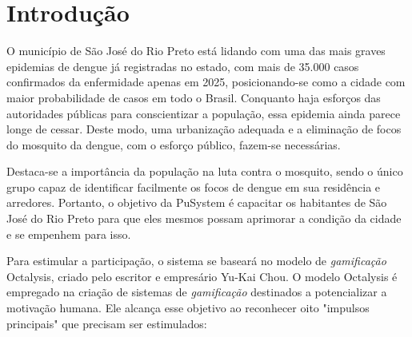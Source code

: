 \documentclass[a5paper, 12pt]{article}
\begin{document}
\section{Introdução}
O município de São José do Rio Preto está lidando com uma das mais graves epidemias de dengue já registradas no estado, com mais de 35.000 casos confirmados da enfermidade apenas em 2025, posicionando-se como a cidade com maior probabilidade de casos em todo o Brasil. Conquanto haja esforços das autoridades públicas para conscientizar a população, essa epidemia ainda parece longe de cessar. Deste modo, uma urbanização adequada e a eliminação de focos do mosquito da dengue, com o esforço público, fazem-se necessárias.

Destaca-se a importância da população na luta contra o mosquito, sendo o único grupo capaz de identificar facilmente os focos de dengue em sua residência e arredores. Portanto, o objetivo da PuSystem é capacitar os habitantes de São José do Rio Preto para que eles mesmos possam aprimorar a condição da cidade e se empenhem para isso.

Para estimular a participação, o sistema se baseará no modelo de \textit{gamificação} Octalysis, criado pelo escritor e empresário Yu-Kai Chou.  O modelo Octalysis é empregado na criação de sistemas de \textit{gamificação} destinados a potencializar a motivação humana.  Ele alcança esse objetivo ao reconhecer oito "impulsos principais" que precisam ser estimulados:
\end{document}
